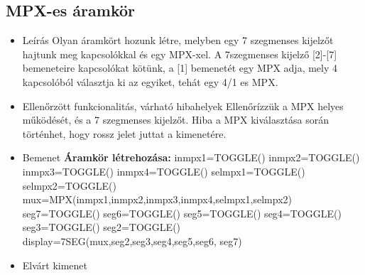 \subsection{MPX-es áramkör}
\begin{itemize}
\item Leírás\newline
Olyan áramkört hozunk létre, melyben egy 7 szegmenses kijelzőt hajtunk meg kapcsolókkal és egy MPX-xel. A 7szegmenses kijelző [2]-[7] bemeneteire kapcsolókat kötünk, a [1] bemenetét egy MPX adja, mely 4 kapcsolóból választja ki az egyiket, tehát egy 4/1 es MPX.
\item Ellenőrzött funkcionalitás, várható hibahelyek\newline
Ellenőrízzük a MPX helyes működését, és a 7 szegmenses kijelzőt. Hiba a MPX kiválasztása során történhet, hogy rossz jelet juttat a kimenetére.
\item Bemenet\newline
\newline
{\bf Áramkör létrehozása:}\newline
inmpx1=TOGGLE()\newline
inmpx2=TOGGLE()\newline
inmpx3=TOGGLE()\newline
inmpx4=TOGGLE()\newline
selmpx1=TOGGLE()\newline
selmpx2=TOGGLE()\newline
mux=MPX(inmpx1,inmpx2,inmpx3,inmpx4,selmpx1,selmpx2)\newline
seg7=TOGGLE()\newline
seg6=TOGGLE()\newline
seg5=TOGGLE()\newline
seg4=TOGGLE()\newline
seg3=TOGGLE()\newline
seg2=TOGGLE()\newline
display=7SEG(mux,seg2,seg3,seg4,seg5,seg6, seg7)\newline
\item Elvárt kimenet\newline
{}
\end{itemize}

